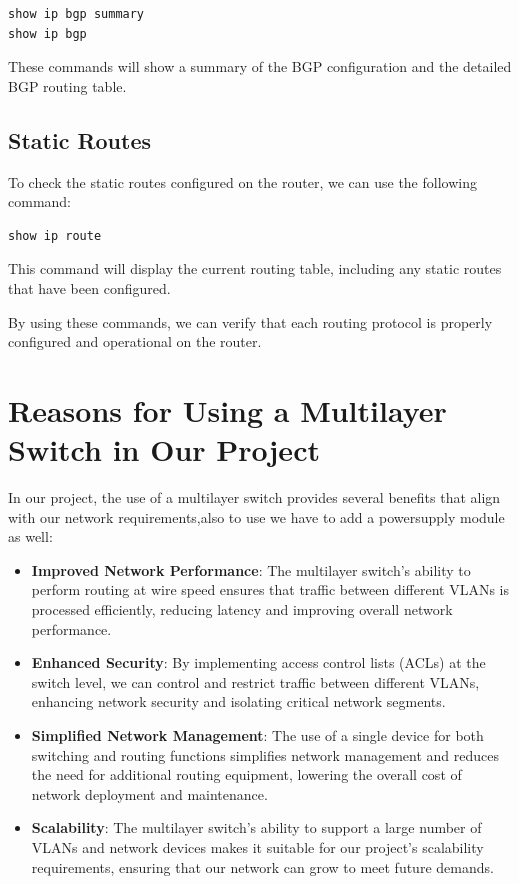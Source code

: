 \documentclass[12pt]{article}
\begin{document}
\begin{verbatim}
show ip bgp summary
show ip bgp
\end{verbatim}

These commands will show a summary of the BGP configuration and the detailed BGP routing table.

\subsection{Static Routes}

To check the static routes configured on the router, we can use the following command:

\begin{verbatim}
show ip route
\end{verbatim}

This command will display the current routing table, including any static routes that have been configured.

By using these commands, we can verify that each routing protocol is properly configured and operational on the router.


\section{Reasons for Using a Multilayer Switch in Our Project}
In our project, the use of a multilayer switch provides several benefits that align with our network requirements,also to use we have to add a powersupply module as well:

\begin{itemize}
    \item \textbf{Improved Network Performance}: The multilayer switch's ability to perform routing at wire speed ensures that traffic between different VLANs is processed efficiently, reducing latency and improving overall network performance.
    \item \textbf{Enhanced Security}: By implementing access control lists (ACLs) at the switch level, we can control and restrict traffic between different VLANs, enhancing network security and isolating critical network segments.
    \item \textbf{Simplified Network Management}: The use of a single device for both switching and routing functions simplifies network management and reduces the need for additional routing equipment, lowering the overall cost of network deployment and maintenance.
    \item \textbf{Scalability}: The multilayer switch's ability to support a large number of VLANs and network devices makes it suitable for our project's scalability requirements, ensuring that our network can grow to meet future demands.
\end{itemize}
\end{document}
